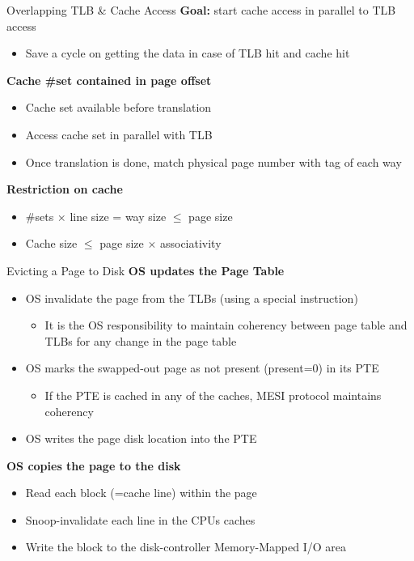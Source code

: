 \documentclass[aspectratio=169,12pt]{beamer}
\begin{document}
\begin{frame}{Overlapping TLB \& Cache Access}
\textbf{Goal:} start cache access in parallel to TLB access
\begin{itemize}
\item Save a cycle on getting the data in case of TLB hit and cache hit
\end{itemize}

\textbf{Cache \#set contained in page offset}
\begin{itemize}
\item Cache set available before translation
\item Access cache set in parallel with TLB
\item Once translation is done, match physical page number with tag of each way
\end{itemize}

\textbf{Restriction on cache}
\begin{itemize}
\item \#sets $\times$ line size = way size $\leq$ page size
\item Cache size $\leq$ page size $\times$ associativity
\end{itemize}
\end{frame}

\begin{frame}{Evicting a Page to Disk}
\textbf{OS updates the Page Table}
\begin{itemize}
\item OS invalidate the page from the TLBs (using a special instruction)
    \begin{itemize}
    \item It is the OS responsibility to maintain coherency between page table and TLBs for any change in the page table
    \end{itemize}
\item OS marks the swapped-out page as not present (present=0) in its PTE
    \begin{itemize}
    \item If the PTE is cached in any of the caches, MESI protocol maintains coherency
    \end{itemize}
\item OS writes the page disk location into the PTE
\end{itemize}

\textbf{OS copies the page to the disk}
\begin{itemize}
\item Read each block (=cache line) within the page
\item Snoop-invalidate each line in the CPUs caches
\item Write the block to the disk-controller Memory-Mapped I/O area
\end{itemize}
\end{frame}
\end{document}
